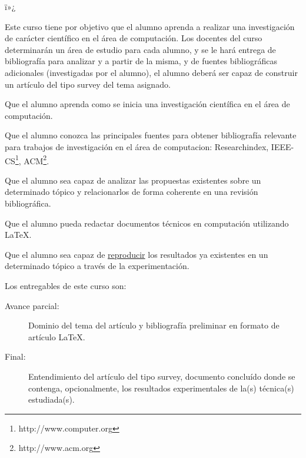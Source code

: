 ï»¿\begin{syllabus}


\begin{justification}
Este curso tiene por objetivo que el alumno aprenda a realizar una
investigación de carácter científico en el área de computación. Los docentes del curso determinarán un área de estudio para cada alumno, y se le hará entrega de bibliografía para analizar y a partir de la misma, y de fuentes bibliográficas adicionales (investigadas por el alumno), el alumno deberá ser capaz de construir un artículo del tipo survey del tema asignado.
\end{justification}

\begin{goals}
\item Que el alumno aprenda como se inicia una investigación científica en el área de computación.
\item Que el alumno conozca las principales fuentes para obtener bibliografía relevante para trabajos de investigación en el área de computacion: Researchindex, IEEE-CS\footnote{http://www.computer.org}, ACM\footnote{http://www.acm.org}.
\item Que el alumno sea capaz de analizar las propuestas existentes sobre un determinado tópico y relacionarlos de forma coherente en una revisión bibliográfica.
\item Que el alumno pueda redactar documentos técnicos en computación utilizando \LaTeX.
\item Que el alumno sea capaz de \underline{reproducir} los resultados ya existentes en un determinado tópico a través de la experimentación.
\item Los entregables de este curso son:
	\begin{description}
	\item [Avance parcial:] Dominio del tema del artículo y bibliografía preliminar en formato de artículo \LaTeX.
	\item [Final:] Entendimiento del artículo del tipo survey, documento concluído donde se contenga, opcionalmente, 
	      los resultados experimentales de la(s) técnica(s) estudiada(s).
	\end{description}
\end{goals}


\end{syllabus}
